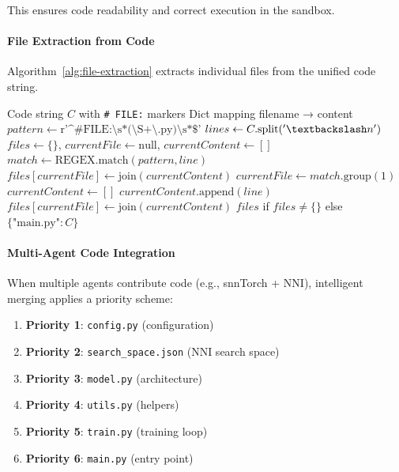 This ensures code readability and correct execution in the sandbox.

\paragraph{File Extraction from Code}
Algorithm~\ref{alg:file-extraction} extracts individual files from the unified code string.

\begin{algorithm}
\caption{File Extraction with Regex Markers}
\label{alg:file-extraction}
\begin{algorithmic}[1]
\REQUIRE Code string \(C\) with \texttt{\# FILE:} markers
\ENSURE Dict mapping filename → content
\STATE \(pattern \gets \text{r'\textasciicircum\# FILE:\textbackslash s*(\textbackslash S+\textbackslash .py)\textbackslash s*\$'}\)
\STATE \(lines \gets C.\text{split}('\textbackslash n')\)
\STATE \(files \gets \{\}\), \(currentFile \gets \text{null}\), \(currentContent \gets []\)
    \STATE \(match \gets \text{REGEX.match}(pattern, line)\)
            \STATE \(files[currentFile] \gets \text{join}(currentContent)\)
        \ENDIF
        \STATE \(currentFile \gets match.\text{group}(1)\)
        \STATE \(currentContent \gets []\)
        \STATE \(currentContent.\text{append}(line)\)
    \ENDIF
\ENDFOR
{}
    \STATE \(files[currentFile] \gets \text{join}(currentContent)\)
\ENDIF
\RETURN \(files\) if \(files \neq \{\}\) else \(\{\text{"main.py"}: C\}\)
\end{algorithmic}
\end{algorithm}

\paragraph{Multi-Agent Code Integration}
When multiple agents contribute code (e.g., snnTorch + NNI), intelligent merging applies a priority scheme:

\begin{enumerate}
  \item \textbf{Priority 1}: \texttt{config.py} (configuration)
  \item \textbf{Priority 2}: \texttt{search\_space.json} (NNI search space)
  \item \textbf{Priority 3}: \texttt{model.py} (architecture)
  \item \textbf{Priority 4}: \texttt{utils.py} (helpers)
  \item \textbf{Priority 5}: \texttt{train.py} (training loop)
  \item \textbf{Priority 6}: \texttt{main.py} (entry point)
\end{enumerate}

